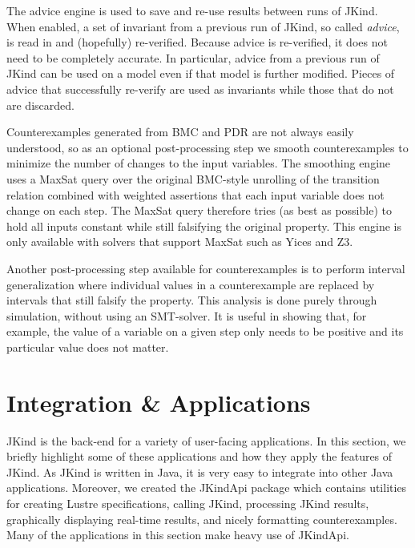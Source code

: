 \documentclass{llncs}
\newcommand{\jkind}{{\sc JKind}\xspace}
\newcommand{\jkindapi}{{\sc JKindApi}\xspace}
\newcommand{\lustre}{{\sc Lustre}\xspace}
\renewcommand{\paragraph}[1]{\vspace{5pt}\noindent {\bf #1}}
\begin{document}
\paragraph{Advice.} The advice engine is used to save and re-use
results between runs of \jkind. When enabled, a set of invariant from a
previous run of \jkind, so called {\em advice}, is read in and
(hopefully) re-verified. Because advice is re-verified, it does not
need to be completely accurate. In particular, advice from a previous
run of \jkind can be used on a model even if that model is further
modified. Pieces of advice that successfully re-verify are used as
invariants while those that do not are discarded.

\paragraph{Smoothing.} Counterexamples generated from BMC and PDR are
not always easily understood, so as an optional post-processing step
we smooth counterexamples to minimize the number of changes to the
input variables. The smoothing engine uses a {\sc MaxSat} query over
the original BMC-style unrolling of the transition relation combined
with weighted assertions that each input variable does not change on
each step. The {\sc MaxSat} query therefore tries (as best as
possible) to hold all inputs constant while still falsifying the
original property. This engine is only available with solvers that
support {\sc MaxSat} such as Yices and Z3.

\paragraph{Interval Generalization.} Another post-processing step
available for counterexamples is to perform interval generalization
where individual values in a counterexample are replaced by intervals
that still falsify the property. This analysis is done purely through
simulation, without using an SMT-solver. It is useful in showing
that, for example, the value of a variable on a given step only needs
to be positive and its particular value does not matter.

\section{Integration \& Applications}

\jkind is the back-end for a variety of user-facing applications. In
this section, we briefly highlight some of these applications and how
they apply the features of JKind. As \jkind is written in Java, it is
very easy to integrate into other Java applications. Moreover, we
created the \jkindapi package which contains utilities for creating
\lustre specifications, calling \jkind, processing \jkind results,
graphically displaying real-time results, and nicely formatting
counterexamples. Many of the applications in this section make heavy
use of \jkindapi.
\end{document}
